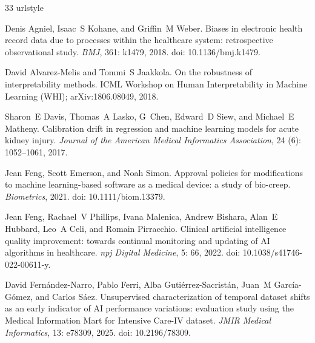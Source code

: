 \documentclass[10pt,a4paper,twocolumn]{article}
\begin{document}
	\begin{thebibliography}{33}
		\providecommand{\natexlab}[1]{#1}
		\providecommand{\url}[1]{\texttt{#1}}
		\expandafter\ifx\csname urlstyle\endcsname\relax
		\providecommand{\doi}[1]{doi: #1}\else
		\providecommand{\doi}{doi: \begingroup \urlstyle{rm}\Url}\fi
		
		Denis Agniel, Isaac~S Kohane, and Griffin~M Weber.
		\newblock Biases in electronic health record data due to processes within the
		healthcare system: retrospective observational study.
		\newblock \emph{BMJ}, 361: k1479, 2018.
		\newblock \doi{10.1136/bmj.k1479}.
		
		David Alvarez-Melis and Tommi~S Jaakkola.
		\newblock On the robustness of interpretability methods.
		\newblock ICML Workshop on Human Interpretability in Machine Learning (WHI);
		arXiv:1806.08049, 2018.
		
		Sharon~E Davis, Thomas~A Lasko, G~Chen, Edward~D Siew, and Michael~E Matheny.
		\newblock Calibration drift in regression and machine learning models for acute
		kidney injury.
		\newblock \emph{Journal of the American Medical Informatics Association},
		24 (6): 1052--1061, 2017.
		
		Jean Feng, Scott Emerson, and Noah Simon.
		\newblock Approval policies for modifications to machine learning-based
		software as a medical device: a study of bio-creep.
		\newblock \emph{Biometrics}, 2021.
		\newblock \doi{10.1111/biom.13379}.
		
		Jean Feng, Rachael~V Phillips, Ivana Malenica, Andrew Bishara, Alan~E Hubbard,
		Leo~A Celi, and Romain Pirracchio.
		\newblock Clinical artificial intelligence quality improvement: towards
		continual monitoring and updating of {AI} algorithms in healthcare.
		\newblock \emph{npj Digital Medicine}, 5: 66, 2022.
		\newblock \doi{10.1038/s41746-022-00611-y}.
		
		David Fern{\'a}ndez-Narro, Pablo Ferri, Alba Guti{\'e}rrez-Sacrist{\'a}n,
		Juan~M Garc{\'i}a-G{\'o}mez, and Carlos S{\'a}ez.
		\newblock Unsupervised characterization of temporal dataset shifts as an early
		indicator of {AI} performance variations: evaluation study using the {Medical
			Information Mart for Intensive Care-IV} dataset.
		\newblock \emph{JMIR Medical Informatics}, 13: e78309, 2025.
		\newblock \doi{10.2196/78309}.
		

\end{thebibliography}
\end{document}
